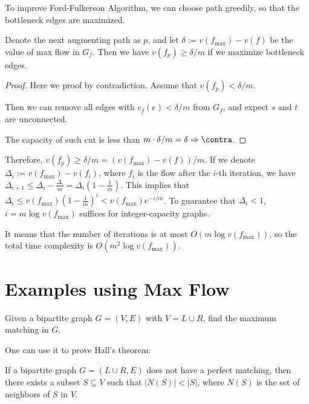 To improve Ford-Fulkerson Algorithm, we can choose path greedily, so that the bottleneck edges are maximized.

\begin{lemma}
	Denote the next augmenting path as $p$, and let $\delta := v(f_{\max})-v(f)$ be the value of max flow in $G_f$. Then we have $v(f_p) \ge \delta/m$ if we maximize bottleneck edges.
\end{lemma}
\begin{proof}
	Here we proof by contradiction. Assume that $v(f_p) < \delta/m$.

	Then we can remove all edges with $c_f(e) < \delta/m$ from $G_f$, and expect $s$ and $t$ are unconnected.

	The capacity of such cut is less than $m \cdot \delta/m = \delta \Rightarrow \contra$.
\end{proof}

Therefore, $v(f_p)\ge \delta/m = (v(f_{\max})-v(f))/m$.
If we denote $\Delta_i := v(f_{\max})-v(f_i)$, where $f_i$ is the flow after the $i$-th iteration, we have $\Delta_{i+1} \leq \Delta_i - \frac{\Delta_i}{m} = \Delta_i (1 - \frac{1}{m})$. This implies that $\Delta_i \leq v(f_{\max})(1 - \frac{1}{m})^i < v(f_{\max}) e^{-i/m}$. To guarantee that $\Delta_i < 1$, $i = m \log v(f_{\max})$ suffices for integer-capacity graphs.

It means that the number of iterations is at most $O(m \log v(f_{\max}))$, so the total time complexity is $O(m^2 \log v(f_{\max}))$.

\section{Examples using Max Flow}

\begin{problem}
Given a bipartite graph $G = (V, E)$ with $V = L \cup R$, find the maximum matching in $G$.
\end{problem}

One can use it to prove Hall's theorem:
\begin{theorem}
	If a bipartite graph $G = (L \cup R, E)$ does not have a perfect matching, then there exists a subset $S \subseteq V$ such that $|N(S)| < |S|$, where $N(S)$ is the set of neighbors of $S$ in $V$.
\end{theorem}
